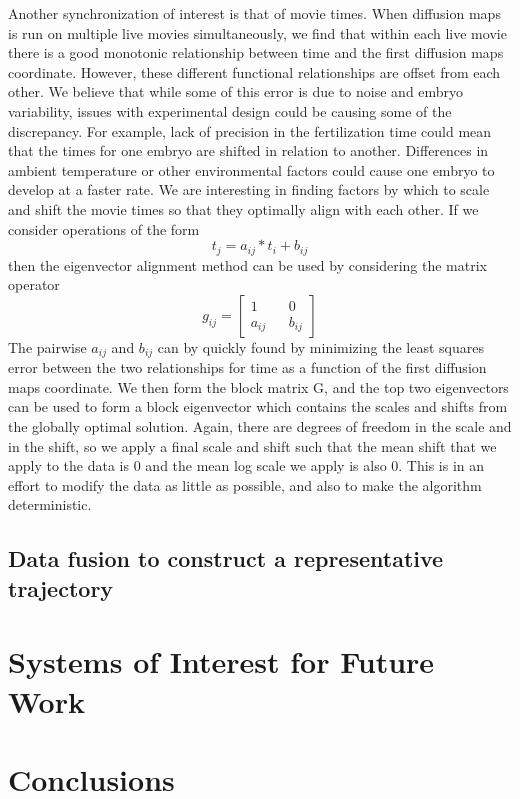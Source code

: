 \documentclass[12pt]{article}
\begin{document}
Another synchronization of interest is that of movie times.  When diffusion maps is run on multiple live movies simultaneously, we find that within each live movie there is a good monotonic relationship between time and the first diffusion maps coordinate. However, these different functional relationships are offset from each other. We believe that while some of this error is due to noise and embryo variability, issues with experimental design could be causing some of the discrepancy. For example, lack of precision in the fertilization time could mean that the times for one embryo are shifted in relation to another. Differences in ambient temperature or other environmental factors could cause one embryo to develop at a faster rate. We are interesting in finding factors by which to scale and shift the movie times so that they optimally align with each other. If we consider operations of the form
\[
t_j = a_{ij}*t_i+b_{ij}
\]
then the eigenvector alignment method can be used by considering the matrix operator
\[
g_{ij}=
\begin{bmatrix}
1 && 0\\
a_{ij} && b_{ij}
\end{bmatrix}
\]
The pairwise $a_{ij}$ and $b_{ij}$ can by quickly found by minimizing the least squares error between the two relationships for time as a function of the first diffusion maps coordinate. We then form the block matrix G, and the top two eigenvectors can be used to form a block eigenvector which contains the scales and shifts from the globally optimal solution. Again, there are degrees of freedom in the scale and in the shift, so we apply a final scale and shift such that the mean shift that we apply to the data is 0 and the mean log scale we apply is also 0. This is in an effort to modify the data as little as possible, and also to make the algorithm deterministic.

\subsection{Data fusion to construct a representative trajectory}

\section{Systems of Interest for Future Work}



\section{Conclusions}



\end{document}
